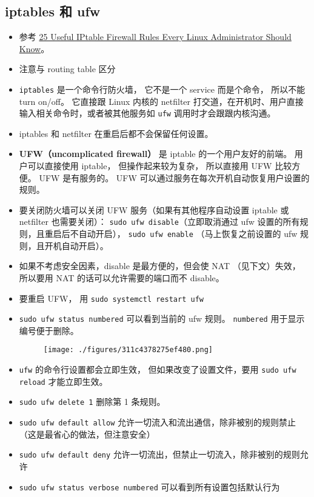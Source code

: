 \subsection{iptables 和 ufw}
\begin{itemize}
\item 参考 \href{https://www.tecmint.com/linux-iptables-firewall-rules-examples-commands/}{25 Useful IPtable Firewall Rules Every Linux Administrator Should Know}。
\item 注意与 routing table 区分
\item \verb`iptables` 是一个命令行防火墙， 它不是一个 service 而是个命令， 所以不能 turn on/off。 它直接跟 Linux 内核的 netfilter 打交道，在开机时、用户直接输入相关命令时，或者被其他服务如 \verb`ufw` 调用时才会跟跟内核沟通。
\item iptables 和 netfilter 在重启后都不会保留任何设置。
\item \textbf{UFW（uncomplicated firewall）} 是 iptable 的一个用户友好的前端。 用户可以直接使用 iptable， 但操作起来较为复杂， 所以直接用 UFW 比较方便。 UFW 是有服务的。 UFW 可以通过服务在每次开机自动恢复用户设置的规则。
\item 要关闭防火墙可以关闭 UFW 服务（如果有其他程序自动设置 iptable 或 netfilter 也需要关闭）： \verb`sudo ufw disable`（立即取消通过 ufw 设置的所有规则，且重启后不自动开启）， \verb`sudo ufw enable` （马上恢复之前设置的 ufw 规则，且开机自动开启）。
\item 如果不考虑安全因素，disable 是最方便的，但会使 NAT （见下文）失效， 所以要用 NAT 的话可以允许需要的端口而不 disable。
\item 要重启 UFW， 用 \verb`sudo systemctl restart ufw`
\item \verb`sudo ufw status numbered` 可以看到当前的 ufw 规则。 \verb`numbered` 用于显示编号便于删除。
\begin{figure}[ht]
\centering
\texttt{[image: ./figures/311c4378275ef480.png]}
\caption{} \label{fig_LinWeb_2}
\end{figure}
\item \verb`ufw` 的命令行设置都会立即生效， 但如果改变了设置文件，要用 \verb`sudo ufw reload` 才能立即生效。
\item \verb`sudo ufw delete 1` 删除第 1 条规则。
\item \verb`sudo ufw default allow` 允许一切流入和流出通信，除非被别的规则禁止（这是最省心的做法，但注意安全）
\item \verb`sudo ufw default deny` 允许一切流出，但禁止一切流入，除非被别的规则允许
\item \verb`sudo ufw status verbose numbered` 可以看到所有设置包括默认行为

\end{itemize}
